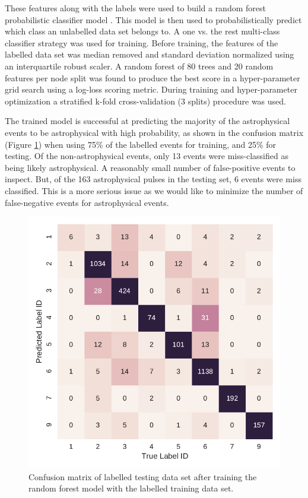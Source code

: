 \documentclass[a4paper,fleqn,usenatbib]{mnras}
\begin{document}
These features along with the labels were used to build a random forest
probabilistic classifier model \citep{Ho:1995:RDF:844379.844681,Breiman2001}.
This model is then used to probabilistically predict which class an unlabelled
data set belongs to. A one vs. the rest multi-class classifier strategy was used
for training. Before training, the features of the labelled data set was median
removed and standard deviation normalized using an interquartile robust scaler.
A random forest of 80 trees and 20 random features per node split was found to
produce the best score in a hyper-parameter grid search using a
log-loss scoring metric. During training and hyper-parameter optimization a
stratified k-fold cross-validation (3 splits) procedure was used.

The trained model is successful at predicting the majority of the astrophysical
events to be astrophysical with high probability, as shown in the confusion
matrix (Figure \ref{fig:confuse}) when using 75\% of the labelled events for
training, and 25\% for testing. Of the non-astrophysical events, only 13 events
were miss-classified as being likely astrophysical. A reasonably small number of
false-positive events to inspect. But, of the 163 astrophysical pulses in the
testing set, 6 events were miss classified. This is a more serious issue as we
would like to minimize the number of false-negative events for astrophysical
events.

\begin{figure}
    \includegraphics[width=1.0\linewidth]{figures/confusion_matrix.pdf}
    \caption{Confusion matrix of labelled testing data set after training the
    random forest model with the labelled training data set.
    }
    \label{fig:confuse}
\end{figure}
\end{document}
